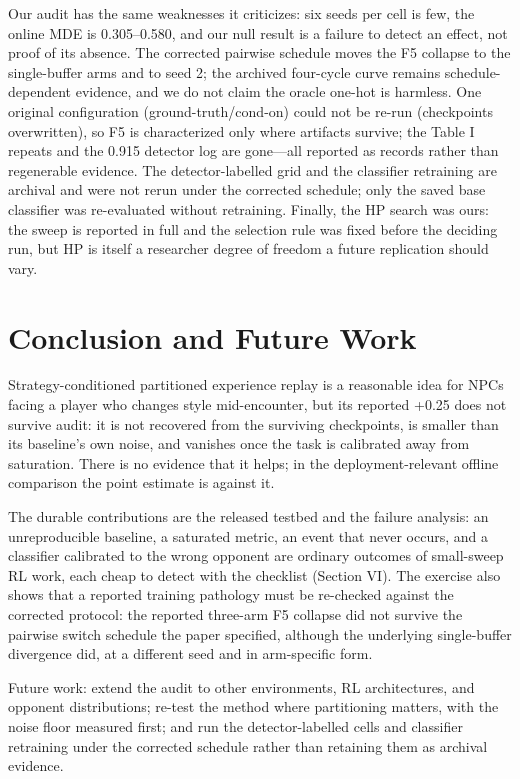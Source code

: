 \documentclass[conference,9pt]{IEEEtran}
\begin{document}
Our audit has the same weaknesses it criticizes: six seeds per cell is few, the online MDE is 0.305--0.580, and our null result is a failure to detect an effect, not proof of its absence. The corrected pairwise schedule moves the F5 collapse to the single-buffer arms and to seed 2; the archived four-cycle curve remains schedule-dependent evidence, and we do not claim the oracle one-hot is harmless. One original configuration (ground-truth/cond-on) could not be re-run (checkpoints overwritten), so F5 is characterized only where artifacts survive; the Table I repeats and the 0.915 detector log are gone---all reported as records rather than regenerable evidence. The detector-labelled grid and the classifier retraining are archival and were not rerun under the corrected schedule; only the saved base classifier was re-evaluated without retraining. Finally, the HP search was ours: the sweep is reported in full and the selection rule was fixed before the deciding run, but HP is itself a researcher degree of freedom a future replication should vary.

\section{Conclusion and Future Work}

Strategy-conditioned partitioned experience replay is a reasonable idea for NPCs facing a player who changes style mid-encounter, but its reported +0.25 does not survive audit: it is not recovered from the surviving checkpoints, is smaller than its baseline's own noise, and vanishes once the task is calibrated away from saturation. There is no evidence that it helps; in the deployment-relevant offline comparison the point estimate is against it.

The durable contributions are the released testbed and the failure analysis: an unreproducible baseline, a saturated metric, an event that never occurs, and a classifier calibrated to the wrong opponent are ordinary outcomes of small-sweep RL work, each cheap to detect with the checklist (Section VI). The exercise also shows that a reported training pathology must be re-checked against the corrected protocol: the reported three-arm F5 collapse did not survive the pairwise switch schedule the paper specified, although the underlying single-buffer divergence did, at a different seed and in arm-specific form.

Future work: extend the audit to other environments, RL architectures, and opponent distributions; re-test the method where partitioning matters, with the noise floor measured first; and run the detector-labelled cells and classifier retraining under the corrected schedule rather than retaining them as archival evidence.
\end{document}
